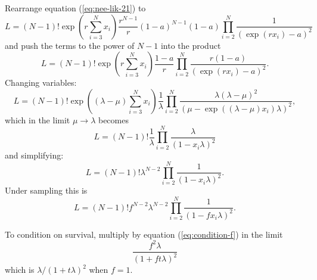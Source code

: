 \documentclass[12pt]{article}
\begin{document}
Rearrange equation (\ref{eq:nee-lik-21}) to
\begin{equation}
  \label{eq:nee-lik-21-rearr}
  L = 
  (N-1)!\exp\left(r\sum_{i=3}^Nx_i\right)
  \frac{r^{N-1}}{r}(1-a)^{N-1}(1-a)
  \prod_{i=2}^N\frac{1}{(\exp(r x_i) - a)^2}
\end{equation}
and push the terms to the power of $N-1$ into the product
\begin{equation}
  \label{eq:nee-lik-21-rearr2}
  L = 
  (N-1)!\exp\left(r\sum_{i=3}^Nx_i\right)
  \frac{1-a}{r}
  \prod_{i=2}^N\frac{r(1-a)}{(\exp(r x_i) - a)^2}.
\end{equation}
Changing variables:
\begin{equation}
  \label{eq:nee-lik-21-rearr3}
  L = 
  (N-1)!\exp\left((\lambda-\mu)\sum_{i=3}^Nx_i\right)
  \frac{1}{\lambda}
  \prod_{i=2}^N\frac{\lambda(\lambda - \mu)^2}{
    (\mu - \exp((\lambda-\mu) x_i)\lambda)^2},
\end{equation}
which in the limit $\mu\to\lambda$ becomes
\begin{equation}
  L = 
  (N-1)!\frac{1}{\lambda}
  \prod_{i=2}^N\frac{\lambda}{(1 - x_i\lambda)^2}
\end{equation}
and simplifying:
\begin{equation}
  L = 
  (N-1)!\lambda^{N-2}\prod_{i=2}^N\frac{1}{(1 - x_i\lambda)^2}.
\end{equation}
Under sampling this is
\begin{equation}
  L = 
  (N-1)!f^{N-2}\lambda^{N-2}\prod_{i=2}^N\frac{1}{(1 - f x_i\lambda)^2}.
\end{equation}

To condition on survival, multiply by equation (\ref{eq:condition-f})
in the limit
\begin{equation}
  \frac{f^2\lambda}{(1 + ft\lambda)^2}
\end{equation}
which is $\lambda / (1+t\lambda)^2$ when $f=1$.



\end{document}
